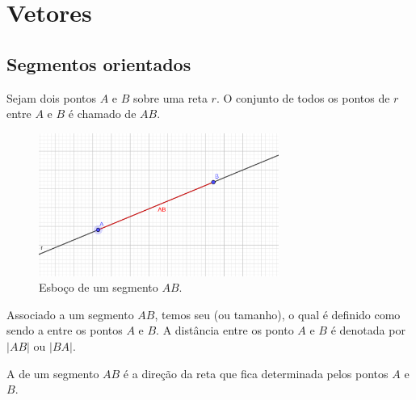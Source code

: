 
\chapter{Vetores}\label{cap_vetor}
\thispagestyle{fancy}

\section{Segmentos orientados}\label{cap_vetor_sec_segorien}

Sejam dois pontos $A$ e $B$ sobre uma reta $r$. O conjunto de todos os pontos de $r$ entre $A$ e $B$ é chamado de  $AB$.

\begin{figure}[h!]
  \centering
  \includegraphics[width=0.7\textwidth]{./cap_vetor/dados/fig_segmento/fig_segmento}
  \caption{Esboço de um segmento $AB$.}
  \label{fig:segmento}
\end{figure}

Associado a um segmento $AB$, temos seu  (ou tamanho), o qual é definido como sendo a  entre os pontos $A$ e $B$. A distância entre os ponto $A$ e $B$ é denotada por $|AB|$ ou $|BA|$.

A  de um segmento $AB$ é a direção da reta que fica determinada pelos pontos $A$ e $B$.

